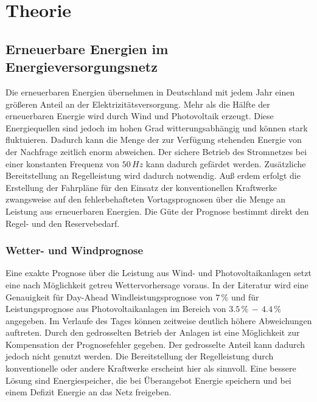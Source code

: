 \chapter{Theorie}
\label{chap:theorie}
\minitoc


\section{Erneuerbare Energien im Energieversorgungsnetz}

Die erneuerbaren Energien \"ubernehmen in Deutschland mit jedem Jahr einen
gr\"o\ss eren Anteil an der Elektrizit\"atsversorgung. Mehr als die H\"alfte
der
erneuerbaren Energie wird durch Wind und Photovoltaik erzeugt. Diese
Energiequellen sind jedoch im hohen Grad witterungsabh\"angig und k\"onnen stark
fluktuieren. Dadurch kann die Menge der zur Verf\"ugung stehenden Energie von
der Nachfrage zeitlich enorm abweichen. Der sichere Betrieb des Stromnetzes bei
einer konstanten Frequenz von $50\,Hz$ kann dadurch gef\"ardet werden.
Zus\"atzliche Bereitstellung an Regelleistung wird dadurch notwendig. Au\ss
erdem erfolgt die Erstellung der Fahrpl\"ane f\"ur den Einsatz der
konventionellen Kraftwerke zwangsweise auf den fehlerbehafteten Vortagsprognosen
\"uber die Menge an Leistung aus erneuerbaren Energien.  Die G\"ute der Prognose
bestimmt direkt den Regel- und den Reservebedarf.


\subsection*{Wetter- und Windprognose}

Eine exakte Prognose \"uber die Leistung aus Wind- und Photovoltaikanlagen setzt
eine nach M\"oglichkeit getreu Wettervorhersage voraus. In der Literatur wird
eine Genauigkeit f\"ur Day-Ahead Windleistungsprognose von $7\,\%$
\cite{prognose_doctor} und f\"ur Leistungsprognose aus Photovoltaikanlagen im
Bereich von $3.5\,\%\,-\,4.4\,\%$ \cite{solarvorhersagung} angegeben. Im
Verlaufe des Tages k\"onnen zeitweise deutlich h\"ohere Abweichungen auftreten.
Durch den gedrosselten Betrieb der Anlagen ist eine M\"oglichkeit zur
Kompensation der Prognosefehler gegeben. Der gedrosselte Anteil kann dadurch
jedoch nicht genutzt werden. Die Bereitstellung der Regelleistung durch
konventionelle oder andere Kraftwerke erscheint hier als sinnvoll. Eine bessere
L\"osung sind Energiespeicher, die bei \"Uberangebot Energie speichern und bei
einem Defizit Energie an das Netz freigeben.

